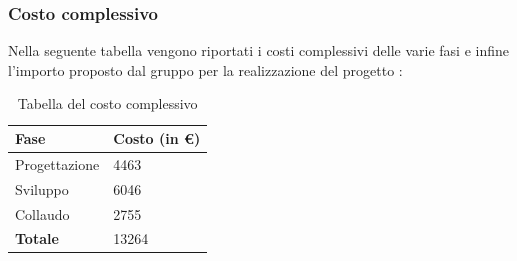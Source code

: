 \subsubsection{Costo complessivo}
Nella seguente tabella vengono riportati i costi complessivi delle varie fasi e infine l'importo proposto dal gruppo \Gruppo{} per la realizzazione del progetto \NomeProgetto{}:\\
{
\renewcommand{\arraystretch}{2}
\begin{longtable}{ C{5cm} C{5cm}}
\caption{Tabella del costo complessivo}\\
\rowcolor{\primaryColor}

\textcolor{\secondaryColor}{\textbf{Fase}} &
\textcolor{\secondaryColor}{\textbf{Costo  (in \euro{})}}\\	
\endhead

Progettazione  &  4463 \\
Sviluppo & 6046  \\
Collaudo &  2755 \\
\textbf{Totale}  &  13264 \\

\end{longtable}
}